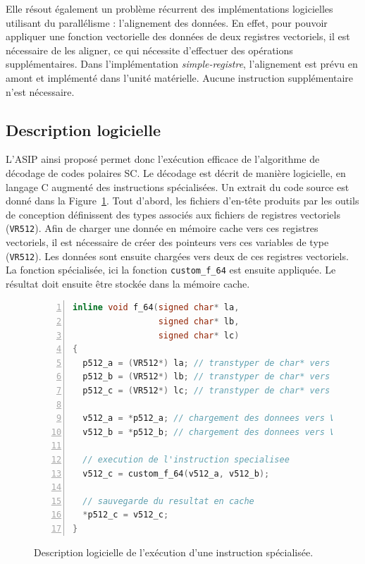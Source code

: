 Elle résout également un problème récurrent des implémentations logicielles utilisant du parallélisme : l'alignement des données. En effet, pour pouvoir appliquer une fonction vectorielle des données de deux registres vectoriels, il est nécessaire de les aligner, ce qui nécessite d'effectuer des opérations supplémentaires. Dans l'implémentation \textit{simple-registre}, l'alignement est prévu en amont et implémenté dans l'unité matérielle. Aucune instruction supplémentaire n'est nécessaire. 

\subsection{Description logicielle}
L'ASIP ainsi proposé permet donc l'exécution efficace de l'algorithme de décodage de codes polaires SC. Le décodage est décrit de manière logicielle, en langage C augmenté des instructions spécialisées. Un extrait du code source est donné dans la Figure~\ref{fig:f_code}. Tout d'abord, les fichiers d'en-tête produits par les outils de conception définissent des types associés aux fichiers de registres vectoriels (\texttt{VR512}). Afin de charger une donnée en mémoire cache vers ces registres vectoriels, il est nécessaire de créer des pointeurs vers ces variables de type (\texttt{VR512}). Les données sont ensuite chargées vers deux de ces registres vectoriels. La fonction spécialisée, ici la fonction \texttt{custom\_f\_64} est ensuite appliquée. Le résultat doit ensuite être stockée dans la mémoire cache.
\begin{figure}[hb]
\begin{lstlisting}[language=C++, numbers=left, numbersep=0.3em, tabsize=2, basicstyle=\footnotesize\ttfamily]
inline void f_64(signed char* la, 
                 signed char* lb, 
                 signed char* lc)
{
  p512_a = (VR512*) la; // transtyper de char* vers VR512
  p512_b = (VR512*) lb; // transtyper de char* vers VR512
  p512_c = (VR512*) lc; // transtyper de char* vers VR512

  v512_a = *p512_a; // chargement des donnees vers VR512
  v512_b = *p512_b; // chargement des donnees vers VR512
  
  // execution de l'instruction specialisee
  v512_c = custom_f_64(v512_a, v512_b); 
  
  // sauvegarde du resultat en cache
  *p512_c = v512_c;     
}
\end{lstlisting}
\caption{Description logicielle de l'exécution d'une instruction spécialisée.}
\label{fig:f_code}
\end{figure}

